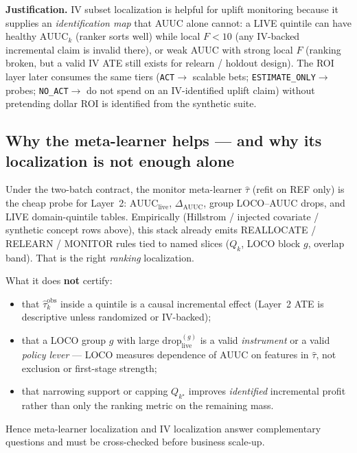 \documentclass{article}
\begin{document}
\noindent\textbf{Justification.}
IV subset localization is helpful for uplift monitoring because it supplies
an \emph{identification map} that AUUC alone cannot: a LIVE quintile can
have healthy $\mathrm{AUUC}_k$ (ranker sorts well) while local $F<10$
(any IV-backed incremental claim is invalid there), or weak AUUC with
strong local $F$ (ranking broken, but a valid IV ATE still exists for
relearn / holdout design).
The ROI layer later consumes the same tiers
(\texttt{ACT}$\to$ scalable bets; \texttt{ESTIMATE\_ONLY}$\to$ probes;
\texttt{NO\_ACT}$\to$ do not spend on an IV-identified uplift claim)
without pretending dollar ROI is identified from the synthetic suite.

\subsection{Why the meta-learner helps --- and why its localization is not enough alone}
\label{sec:meta-helps}

Under the two-batch contract, the monitor meta-learner $\hat\tau$ (refit on
REF only) is the cheap probe for Layer~2: $\mathrm{AUUC}_{\mathrm{live}}$,
$\Delta_{\mathrm{AUUC}}$, group LOCO--AUUC drops, and LIVE domain-quintile
tables.
Empirically (Hillstrom / injected covariate / synthetic concept rows above),
this stack already emits \textsc{REALLOCATE} / \textsc{RELEARN} /
\textsc{MONITOR} rules tied to named slices
($Q_k$, LOCO block $g$, overlap band).
That is the right \emph{ranking} localization.

What it does \textbf{not} certify:
\begin{itemize}\itemsep2pt
  \item that $\widehat{\tau}^{\mathrm{obs}}_k$ inside a quintile is a
        causal incremental effect (Layer~2 ATE is descriptive unless
        randomized or IV-backed);
  \item that a LOCO group $g$ with large $\mathrm{drop}_{\mathrm{live}}^{(g)}$
        is a valid \emph{instrument} or a valid \emph{policy lever} ---
        LOCO measures dependence of AUUC on features in $\hat\tau$, not
        exclusion or first-stage strength;
  \item that narrowing support or capping $Q_{k^\star}$ improves
        \emph{identified} incremental profit rather than only the ranking
        metric on the remaining mass.
\end{itemize}
Hence meta-learner localization and IV localization answer complementary
questions and must be cross-checked before business scale-up.
\end{document}

